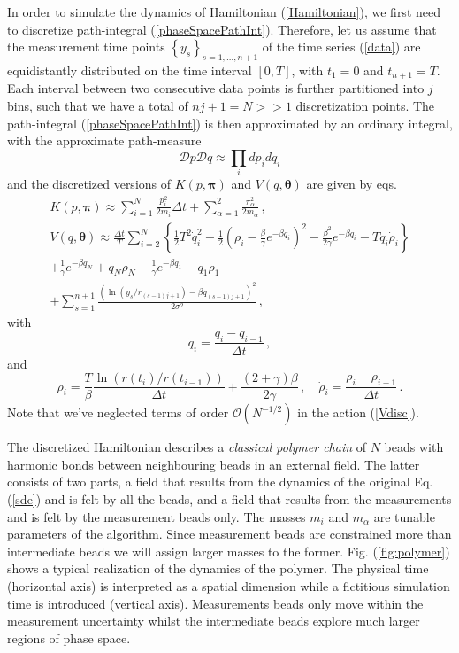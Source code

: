 \documentclass[12pt,a4paper,final]{iopart}
\newcommand{\bt}{\pmb\theta}
\begin{document}
In order to simulate the dynamics of Hamiltonian (\ref{Hamiltonian}), we first need to discretize path-integral (\ref{phaseSpacePathInt}).
Therefore, let us assume that the measurement time points $\left\{ y_s \right\}_{s=1,\dots, n+1}$ of the time series (\ref{data}) are equidistantly distributed on the time interval $[0,T]$, with $t_1=0$ and $t_{n+1}=T$.
Each interval between two consecutive data points is further partitioned into $j$ bins, such that we have a total of $nj+1=N>>1$ discretization points.
The path-integral (\ref{phaseSpacePathInt}) is then approximated by an ordinary integral, with the approximate path-measure
\begin{equation}
  \mathcal Dp\mathcal Dq
  \approx
  \prod_i dp_i dq_i
\end{equation}
and the discretized versions of $K( p,{\pmb\pi})$ and $V( q,\bt)$ are given by eqs.
\begin{eqnarray}
   K( p,{\pmb\pi}) \approx
   \sum_{i=1}^N
   \frac{ p_i^2}{2m_i}\Delta t
   +
   \sum_{\alpha=1}^2\frac{\pi_\alpha^2}{2m_\alpha}\,,\label{Kdisc}
   \\
   V(q,\bt) \approx \frac{\Delta t}{T} \sum_{i=2}^{N}
   \left\{ \frac{1}{2} T^2 \dot q_i^2 + \frac{1}{2}
     \left( \rho_i-\frac{\beta}{\gamma}e^{-\beta q_i} \right)^2 -
    \frac{\beta^2}{2\gamma} e^{-\beta q_i} - T q_i\dot\rho_i \right\}  \nonumber
  \\
  +
  \frac{1}{\gamma}
  e^{-\beta q_N}
  +
  q_N \rho_{N}
  -
  \frac{1}{\gamma}
  e^{-\beta q_1}
  -
  q_1 \rho_{1}
  \nonumber
  \\
  +
  \sum_{s=1}^{n+1}
  \frac{(\ln(y_s/r_{(s-1)j+1}) - {\beta q_{(s-1)j+1}})^2}{2\sigma^2}
  \label{Vdisc}
   \,,
\end{eqnarray}
with
\begin{equation}
  \dot q_i = \frac{q_i-q_{i-1}}{\Delta t}\,,
\end{equation}
and
\begin{equation}\label{rhodisc}
\rho_i = \frac{T}{\beta} \frac{\ln(r(t_{i})/r(t_{i-1}))}{\Delta t}
+
\frac{(2+\gamma)\beta}{2\gamma}
\,,\quad
\dot\rho_i = \frac{\rho_i-\rho_{i-1}}{\Delta t}\,.
\end{equation}
Note that we've neglected terms of order $\mathcal O(N^{-1/2})$ in the action (\ref{Vdisc}).

The discretized Hamiltonian describes a {\em classical polymer chain} of $N$ beads with harmonic bonds between neighbouring beads in an external field. The latter consists of two parts, a field that results from the dynamics of the original Eq. (\ref{sde}) and is felt by all the beads, and a field that results from the measurements and is felt by the measurement beads only. The masses $m_i$ and $m_{\alpha}$ are tunable parameters of the algorithm.
Since measurement beads are constrained more than intermediate beads we will assign larger masses to the former.
Fig. (\ref{fig:polymer}) shows a typical realization of the dynamics of the polymer. 
The physical time (horizontal axis) is interpreted as a spatial dimension while a fictitious simulation time is introduced (vertical axis).
Measurements beads only move within the measurement uncertainty whilst the intermediate beads explore much larger regions of phase space.
\end{document}
